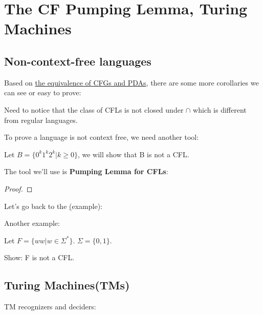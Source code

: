 \chapter{The CF Pumping Lemma, Turing Machines}

\section{Non-context-free languages}

Based on \hyperref[theorem: CFG=PDA]{the equivalence of CFGs and PDAs}, there are some more corollaries we can see or easy to prove:

\begin{corollary}
    
\end{corollary}

Need to notice that the class of CFLs is not closed under \(\cap\) which is different from regular languages.

To prove a language is not context free, we need another tool:
\begin{example}\label{eg: 5.1}
    Let \(B = \{ 0^k 1^k 2^k | k \geq 0\} \), we will show that B is not a CFL. 
\end{example}

The tool we'll use is \textbf{Pumping Lemma for CFLs}: 
\begin{lemma}

\end{lemma}
\begin{proof}
    
\end{proof}


Let's go back to the \hyperref[eg: 5.1](example):
\begin{example}
    
\end{example}

Another example:
\begin{example}
    Let \(F = \{ ww|w \in \Sigma^* \} \). \(\Sigma = \{ 0, 1 \} \). 
    
    Show: F is not a CFL.  
\end{example}

\section{Turing Machines(TMs)}

\begin{example}
    
\end{example}

\begin{definition}
    
\end{definition}

TM recognizers and deciders:
